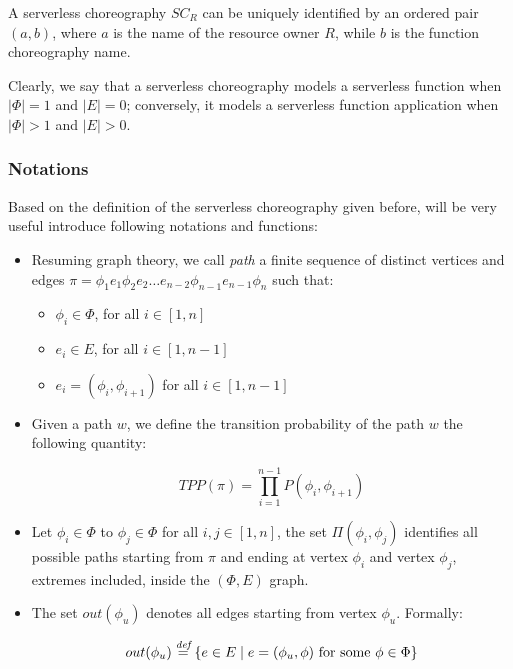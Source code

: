 A serverless choreography $SC_R$ can be uniquely identified by an ordered pair $(a, b)$, where $a$ is the name of the resource owner $R$, while $b$ is the function choreography name.

Clearly, we say that a serverless choreography models a serverless function when $|\Phi| = 1$ and $|E| = 0$; conversely, it models a serverless function application when $|\Phi| > 1$ and $|E| > 0$.

\subsubsection{Notations}

Based on the definition of the serverless choreography given before, will be very useful introduce following notations and functions:

\begin{itemize}
	\item Resuming graph theory, we call \textit{path} a finite sequence of distinct vertices and edges $\pi = \phi_1 e_1 \phi_2 e_2 \ldots e_{n-2}\phi_{n-1} e_{n-1} \phi_n$ such that:
	
	\begin{itemize}
		\item $\phi_i \in \Phi$, for all $i \in \left[ 1, n \right]$
		\item $e_i \in E$, for all $i \in \left[ 1, n-1 \right]$
		\item $e_i = \left( \phi_i, \phi_{i+1} \right)$ for all $i \in \left[ 1, n-1 \right]$
	\end{itemize}
	
	\item Given a path $w$, we define the transition probability of the path $w$ the following quantity:
	
	\begin{equation}
		TPP(\pi) = \prod_{i = 1}^{n-1} P\left(\phi_i, \phi_{i+1} \right)
	\end{equation}

	\item Let $\phi_i \in \Phi$ to $\phi_j \in \Phi$ for all $i,j \in \left[ 1, n \right]$, the set $\Pi(\phi_i, \phi_j)$ identifies all possible paths starting from $\pi$ and ending at vertex $\phi_i$ and vertex $\phi_j$, extremes included, inside the $(\Phi,E)$ graph.
	
	\item The set $out(\phi_u)$ denotes all edges starting from vertex $\phi_u$. Formally: 
	
	\begin{equation}\label{outDef}
		out(\phi_u) \overset{\textit{def}}{=} \left\lbrace e \in E \mid e = (\phi_u, \phi) \text{ for some } \phi \in \Phi  \right\rbrace 
	\end{equation}


\end{itemize}

